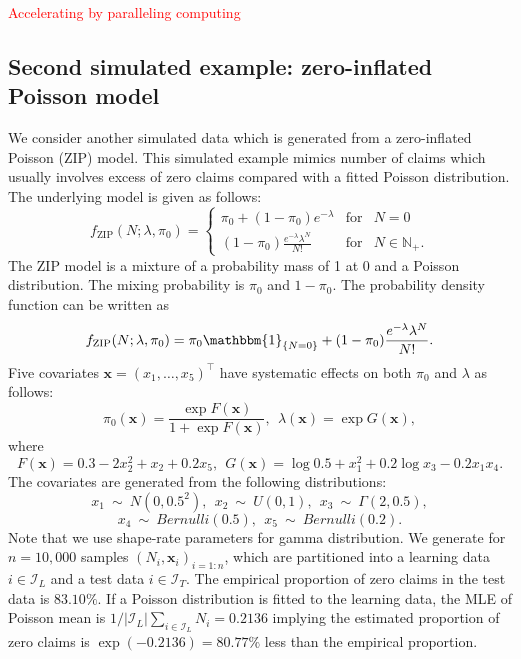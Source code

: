 \documentclass[11pt]{article}
\numberwithin{equation}{section}
\def\N{{\mathbb N}}  %
\def\bx{\boldsymbol{x}}
\newcommand{\red}[1]{\textcolor{red}{#1}}
\begin{document}
\red{Accelerating by paralleling computing}


\subsection{Second simulated example: zero-inflated Poisson model}

We consider another simulated data which is generated from a zero-inflated Poisson (ZIP) model. This simulated example mimics number of claims which usually involves excess of zero claims compared with a fitted Poisson distribution.
The underlying  model is given as follows:
 \begin{equation}
	f_{\text{ZIP}}(N;\lambda,\pi_0) = \left\{ 
	\begin{array}{ccl}
		\pi_0+(1-\pi_0)e^{-\lambda} & \mbox{for}
		& N=0 \\
		(1-\pi_0)\frac{e^{-\lambda}\lambda^N}{N!} & \mbox{for} &N\in\N_+.
	\end{array}\right.
\end{equation}
The ZIP model is a mixture of a probability mass of 1 at 0 and a Poisson distribution. The mixing probability is $\pi_0$ and $1-\pi_0$.
The probability density function can be written as
$$f_\text{ZIP}(N;\lambda,\pi_0)= \pi_0\mathbbm{1}_{\{N=0\}} + 
(1-\pi_0)\frac{e^{-\lambda}\lambda^N}{N!}.$$
Five covariates $\bx=(x_1,\ldots,x_5)^\top$ have systematic effects on both $\pi_0$ and $\lambda$ as follows:
\begin{equation}
	\pi_0(\bx)=\frac{\exp F(\bx)}{1+\exp F(\bx)}, ~~
	\lambda(\bx)=\exp G(\bx), 
\end{equation}
where
\begin{equation}
	 F(\bx)=0.3-2x_2^2+x_2+0.2x_5, ~~G(\bx)=\log 0.5+x_1^2 + 0.2\log x_3 - 0.2x_1 x_4.
\end{equation}
The covariates are generated from the following distributions:
$$	x_1~\sim~N(0,0.5^2), ~~ x_2~\sim~U(0,1), ~~ x_3~\sim~\Gamma(2,0.5),$$ $$x_4~\sim~Bernulli(0.5),~~ x_5~\sim~Bernulli(0.2).$$
Note that we use shape-rate parameters for gamma distribution.
We generate for $n=10,000$ samples $(N_i,\bx_i)_{i=1:n}$, which are partitioned into a learning data $i\in\mathcal{I}_{L}$ and a test data $i\in\mathcal{I}_{T}$. 
The empirical proportion of zero claims in the test data is $83.10\%$. If a Poisson distribution is fitted to the learning data, the MLE of Poisson mean is $1/|\mathcal{I}_L|\sum_{i\in\mathcal{I}_L}N_i=0.2136$ implying the estimated proportion of zero claims is $\exp(-0.2136)=80.77\%$ less than the empirical proportion. 
\end{document}
